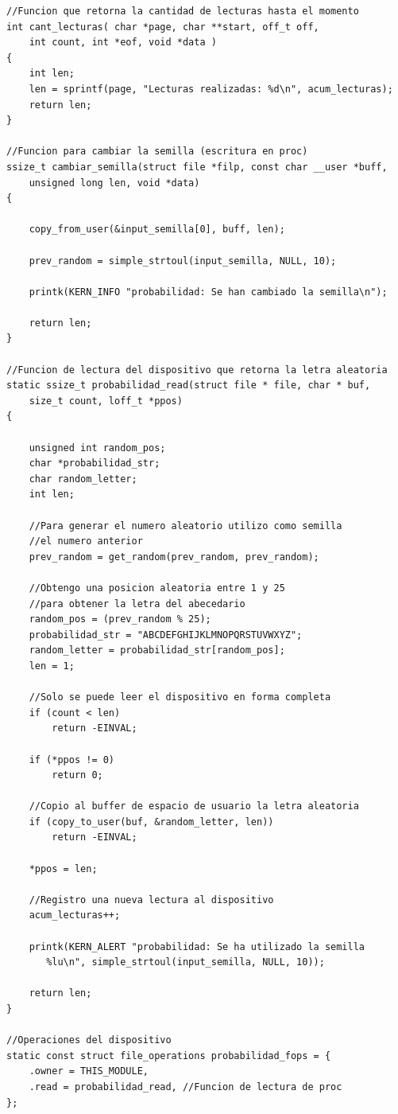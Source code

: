 \documentclass[a4paper,11pt] {article}
\begin{document}
\begin{itemize}
\begin{verbatim}
//Funcion que retorna la cantidad de lecturas hasta el momento
int cant_lecturas( char *page, char **start, off_t off, 
    int count, int *eof, void *data ) 
{
    int len;
    len = sprintf(page, "Lecturas realizadas: %d\n", acum_lecturas);
    return len;
}

//Funcion para cambiar la semilla (escritura en proc)
ssize_t cambiar_semilla(struct file *filp, const char __user *buff, 
    unsigned long len, void *data) 
{

    copy_from_user(&input_semilla[0], buff, len);

    prev_random = simple_strtoul(input_semilla, NULL, 10);
    
    printk(KERN_INFO "probabilidad: Se han cambiado la semilla\n");
    
    return len;
}

//Funcion de lectura del dispositivo que retorna la letra aleatoria
static ssize_t probabilidad_read(struct file * file, char * buf, 
    size_t count, loff_t *ppos) 
{

    unsigned int random_pos;
    char *probabilidad_str;
    char random_letter;
    int len;

    //Para generar el numero aleatorio utilizo como semilla 
    //el numero anterior
    prev_random = get_random(prev_random, prev_random);

    //Obtengo una posicion aleatoria entre 1 y 25 
    //para obtener la letra del abecedario
    random_pos = (prev_random % 25);
    probabilidad_str = "ABCDEFGHIJKLMNOPQRSTUVWXYZ";
    random_letter = probabilidad_str[random_pos];
    len = 1;

    //Solo se puede leer el dispositivo en forma completa
    if (count < len)
        return -EINVAL;

    if (*ppos != 0)
        return 0;

    //Copio al buffer de espacio de usuario la letra aleatoria
    if (copy_to_user(buf, &random_letter, len))
        return -EINVAL;

    *ppos = len;

    //Registro una nueva lectura al dispositivo
    acum_lecturas++;

    printk(KERN_ALERT "probabilidad: Se ha utilizado la semilla 
       %lu\n", simple_strtoul(input_semilla, NULL, 10));

    return len;
}

//Operaciones del dispositivo
static const struct file_operations probabilidad_fops = {
    .owner = THIS_MODULE,
    .read = probabilidad_read, //Funcion de lectura de proc
};


\end{verbatim}
\end{itemize}
\end{document}

